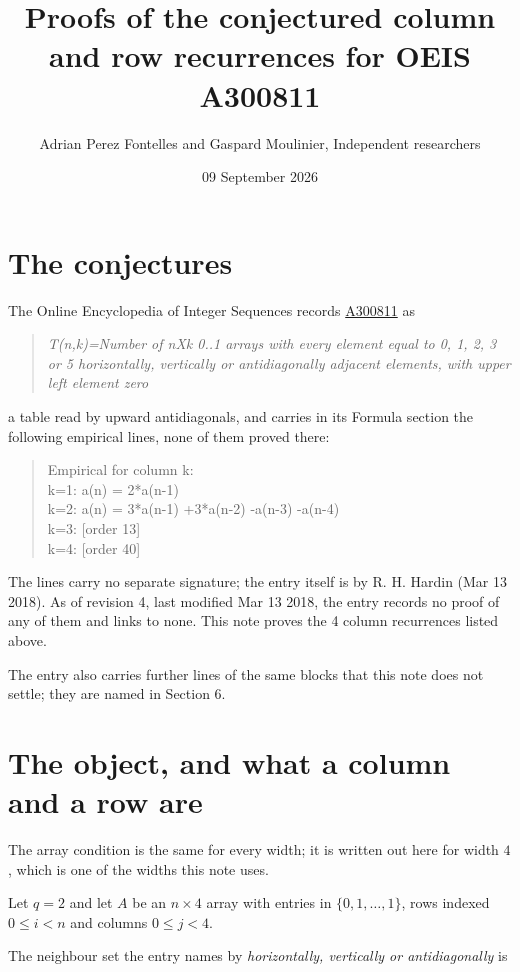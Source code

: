 \documentclass[11pt]{article}
\title{Proofs of the conjectured column and row recurrences for OEIS A300811}
\author{Adrian Perez Fontelles and Gaspard Moulinier, Independent researchers}
\date{09 September 2026}
\theoremstyle{definition}
\begin{document}
\maketitle
\section{The conjectures}

The Online Encyclopedia of Integer Sequences records \href{https://oeis.org/A300811}{A300811} as

\begin{quote}\itshape T(n,k)=Number of nXk 0..1 arrays with every element equal to 0, 1, 2, 3 or 5 horizontally, vertically or antidiagonally adjacent elements, with upper left element zero\end{quote}

a table read by upward antidiagonals, and carries in its Formula section the following empirical lines, none of them proved there:

\begin{quote}\ttfamily Empirical for column k:\\
k=1: a(n) = 2*a(n-1)\\k=2: a(n) = 3*a(n-1) +3*a(n-2) -a(n-3) -a(n-4)\\k=3: [order 13]\\k=4: [order 40]\end{quote}

The lines carry no separate signature; the entry itself is by R. H. Hardin (Mar 13 2018). As of revision 4, last modified Mar 13 2018, the entry records no proof of any of them and links to none. This note proves the 4 column recurrences listed above.

The entry also carries further lines of the same blocks that this note does not settle; they are named in Section 6.

\section{The object, and what a column and a row are}

The array condition is the same for every width; it is written out here for width $4$, which is one of the widths this note uses.

Let $q = 2$ and let $A$ be an $n \times 4$ array with entries in $\{0,1,\dots,1\}$, rows indexed $0 \le i < n$ and columns $0 \le j < 4$.

The neighbour set the entry names by {\itshape horizontally, vertically or antidiagonally} is
\end{document}

